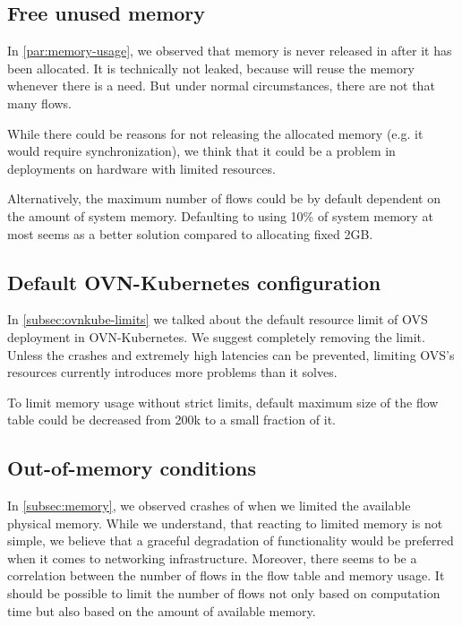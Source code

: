 \subsection{Free unused memory}

In \cref{par:memory-usage}, we observed that memory is never released in  after it has been allocated. It is technically not leaked, because  will reuse the memory whenever there is a need. But under normal circumstances, there are not that many flows. 

While there could be reasons for not releasing the allocated memory (e.g. it would require synchronization), we think that it could be a problem in deployments on hardware with limited resources.

Alternatively, the maximum number of flows could be by default dependent on the amount of system memory. Defaulting to using 10\% of system memory at most seems as a better solution compared to allocating fixed 2GB.


\subsection{Default OVN-Kubernetes configuration}

In \cref{subsec:ovnkube-limits} we talked about the default resource limit of OVS deployment in OVN-Kubernetes. We suggest completely removing the limit. Unless the crashes and extremely high latencies can be prevented, limiting OVS's resources currently introduces more problems than it solves.

To limit memory usage without strict limits, default maximum size of the flow table could be decreased from 200k to a small fraction of it.


\subsection{Out-of-memory conditions}

In \cref{subsec:memory}, we observed crashes of  when we limited the available physical memory. While we understand, that reacting to limited memory is not simple, we believe that a graceful degradation of functionality would be preferred when it comes to networking infrastructure. Moreover, there seems to be a correlation between the number of flows in the flow table and memory usage. It should be possible to limit the number of flows not only based on computation time but also based on the amount of available memory.

